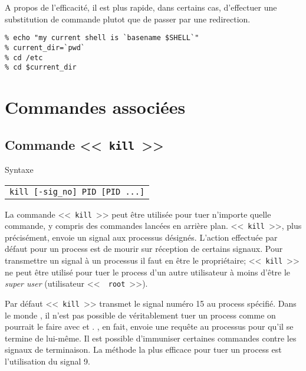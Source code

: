 A propos de l'efficacit{\'e}, il est plus rapide, dans certains cas,
d'effectuer une substitution de commande plutot que de passer par une
redirection.

\begin{example}
\begin{verbatim}
% echo "my current shell is `basename $SHELL`"
% current_dir=`pwd`
% cd /etc
% cd $current_dir
\end{verbatim}
\end{example}

\section{Commandes associ{\'e}es}

\subsection{\label{multi-task-kill}Commande <<~{\tt kill}~>>}

\begin{definition}{Syntaxe}
\begin{tabular}{@{\hspace{1cm}}l}
	{\tt kill [-sig\_no] PID [PID ...]}\\[0.2cm]
\end{tabular}
\end{definition}

La commande <<~\texttt{kill}~>> peut {\^e}tre
utilis{\'e}e pour tuer n'importe quelle commande, y compris des
commandes lanc{\'e}es en arri{\`e}re plan. <<~{\tt kill}~>>, plus
pr{\'e}cis{\'e}ment, envoie un signal aux processus d{\'e}sign{\'e}s.
L'action effectu{\'e}e par d{\'e}faut pour un process est de mourir sur
r{\'e}ception de certains signaux. Pour transmettre un signal {\`a} un
processus il faut en {\^e}tre le propri{\'e}taire; <<~{\tt kill}~>> ne
peut {\^e}tre utilis{\'e} pour tuer le process d'un autre utilisateur
{\`a} moins d'{\^e}tre le {\sl super user} (utilisateur <<~{\tt
root}~>>).

Par d{\'e}faut <<~{\tt kill}~>> transmet le signal num{\'e}ro 15 au process sp{\'e}cifi{\'e}.
Dans le monde {\Unix}, il n'est pas possible de v{\'e}ritablement tuer un process
comme on pourrait le faire avec {\WindowsNT} et {\OpenVMS}. {\Unix}, en fait,
envoie une requ{\^e}te au processus pour qu'il se termine de lui-m{\^e}me. Il est
possible d'immuniser certaines commandes contre les signaux de terminaison. La
m{\'e}thode la plus efficace pour tuer un process est l'utilisation du signal 9.


